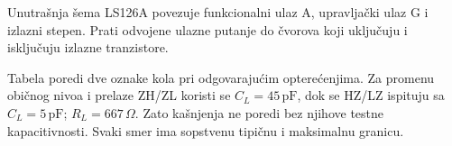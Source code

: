 Unutrašnja šema LS126A povezuje funkcionalni ulaz A, upravljački ulaz G i izlazni stepen. Prati odvojene ulazne putanje do čvorova koji uključuju i isključuju izlazne tranzistore.

Tabela poredi dve oznake kola pri odgovarajućim opterećenjima. Za promenu običnog nivoa i prelaze ZH/ZL koristi se $C_L=45\,\mathrm{pF}$, dok se HZ/LZ ispituju sa $C_L=5\,\mathrm{pF}$; $R_L=667\,\Omega$. Zato kašnjenja ne poredi bez njihove testne kapacitivnosti. Svaki smer ima sopstvenu tipičnu i maksimalnu granicu.
